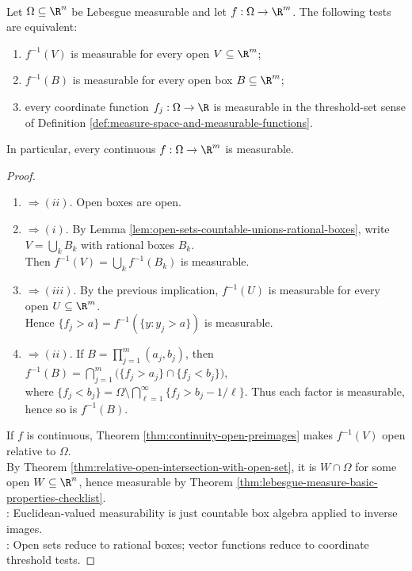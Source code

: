 \begin{proposition} \label{prop:measurable-function-open-set-test} \\
Let $\Omega\subseteq\R^n$ be Lebesgue measurable and let $f:\Omega\to\R^m$. The following tests are equivalent:
\begin{enumerate}[label=(\roman*)]
\setlength{\itemsep}{0pt}
\item $f^{-1}(V)$ is measurable for every open $V\subseteq\R^m$;
\item $f^{-1}(B)$ is measurable for every open box $B\subseteq\R^m$;
\item every coordinate function $f_j:\Omega\to\R$ is measurable in the threshold-set sense of Definition \ref{def:measure-space-and-measurable-functions}.
\end{enumerate}
In particular, every continuous $f:\Omega\to\R^m$ is measurable.
\begin{proof}
\begin{enumerate}[label=(\roman*).]
\setlength{\itemsep}{0pt}
\item[$(i)$]$\Rightarrow (ii)$. Open boxes are open.
\item[$(ii)$]$\Rightarrow (i)$. By Lemma \ref{lem:open-sets-countable-unions-rational-boxes}, write $V=\bigcup_kB_k$ with rational boxes $B_k$.\\
Then $f^{-1}(V)=\bigcup_kf^{-1}(B_k)$ is measurable.
\item[$(ii)$]$\Rightarrow (iii)$. By the previous implication, $f^{-1}(U)$ is measurable for every open $U\subseteq\R^m$.\\
Hence $\{f_j>a\}=f^{-1}(\{y:y_j>a\})$ is measurable.
\item[$(iii)$]$\Rightarrow (ii)$. If $B=\prod_{j=1}^{m}(a_j,b_j)$, then $f^{-1}(B)=\bigcap\limits_{j=1}^{m}\bigl(\{f_j>a_j\}\cap\{f_j<b_j\}\bigr)$,\\
where $\{f_j<b_j\}=\Omega\setminus\bigcap\limits_{\ell=1}^{\infty}\{f_j>b_j-1/\ell\}$. Thus each factor is measurable, hence so is $f^{-1}(B)$.
\end{enumerate}
If $f$ is continuous, Theorem \ref{thm:continuity-open-preimages} makes $f^{-1}(V)$ open relative to $\Omega$.\\
By Theorem \ref{thm:relative-open-intersection-with-open-set}, it is $W\cap\Omega$ for some open $W\subseteq\R^n$, hence measurable by Theorem \ref{thm:lebesgue-measure-basic-properties-checklist}.\\
: Euclidean-valued measurability is just countable box algebra applied to inverse images.\\
: Open sets reduce to rational boxes; vector functions reduce to coordinate threshold tests.
\end{proof}
\end{proposition}

